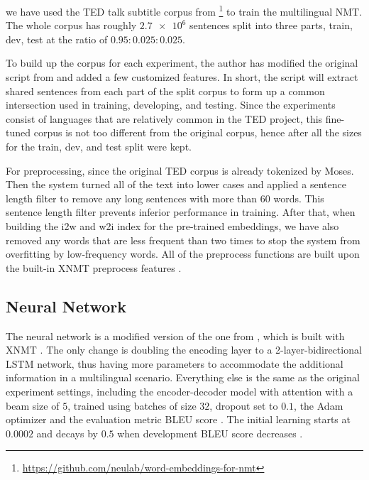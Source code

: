 \documentclass[thesis,fonts=libertine]{cluu}
\begin{document}
we have used the TED talk subtitle corpus from \textcite{Qi:2018aa} \footnote{\url{https://github.com/neulab/word-embeddings-for-nmt}} to train the multilingual NMT. The whole corpus has roughly $\num{2.7e6}$ sentences split into three parts, train, dev, test at the ratio of $0.95:0.025:0.025$.

To build up the corpus for each experiment, the author has modified the original script from \textcite{Qi:2018aa} and added a few customized features. In short, the script will extract shared sentences from each part of the split corpus to form up a common intersection used in training, developing, and testing. Since the experiments consist of languages that are relatively common in the TED project, this fine-tuned corpus is not too different from the original corpus, hence after all the sizes for the train, dev, and test split were kept.

For preprocessing, since the original TED corpus is already tokenized by Moses. Then the system \textcite{Neubig:2018aa} turned all of the text into lower cases and applied a sentence length filter to remove any long sentences with more than 60 words. This sentence length filter prevents inferior performance in training. After that, when building the i2w and w2i index for the pre-trained embeddings, we have also removed any words that are less frequent than two times to stop the system from overfitting by low-frequency words. All of the preprocess functions are built upon the built-in XNMT preprocess features \parencite{Neubig:2018aa}.

\subsection{Neural Network}

The neural network is a modified version of the one from \textcite{Qi:2018aa}, which is built with XNMT \textcite{Neubig:2018aa}. The only change is doubling the encoding layer to a 2-layer-bidirectional LSTM network, thus having more parameters to accommodate the additional information in a multilingual scenario. Everything else is the same as the original experiment settings, including the encoder-decoder model with attention \parencite{Bahdanau:2014aa} with a beam size of $5$, trained using batches of size $32$, dropout set to $0.1$, the Adam optimizer \parencite{Kingma:2014aa} and the evaluation metric BLEU score \parencite{papineni-etal-2002-bleu}. The initial learning starts at $0.0002$ and decays by $0.5$ when development BLEU score decreases \parencite{Denkowski:2017aa}.
\end{document}
